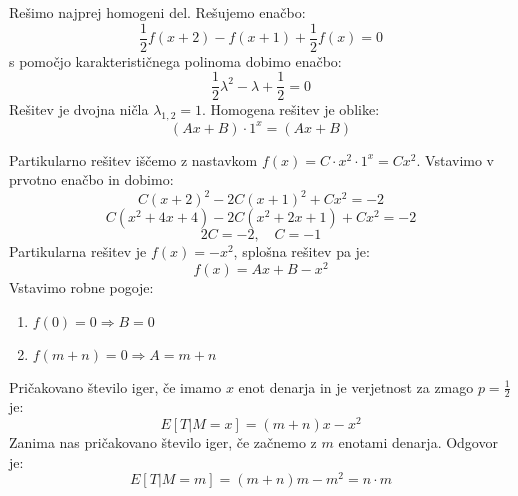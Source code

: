 \documentclass[12pt, a4paper]{article}
\begin{document}
Rešimo najprej homogeni del. Rešujemo enačbo: $$\frac{1}{2}f(x+2)-f(x+1)+\frac{1}{2}f(x)=0$$ s pomočjo karakterističnega polinoma dobimo enačbo: $$\frac{1}{2}\lambda^2-\lambda+\frac{1}{2}=0$$ Rešitev je dvojna ničla $\lambda_{1, 2}= 1$. Homogena rešitev je oblike: $$(Ax+B)\cdot 1^x=(Ax+B)$$

Partikularno rešitev iščemo z nastavkom $f(x)=C\cdot x^2\cdot 1^x= Cx^2$. Vstavimo v prvotno enačbo in dobimo:
$$C(x+2)^2-2C(x+1)^2+Cx^2=-2$$
$$C(x^2+4x+4)-2C(x^2+2x+1)+Cx^2=-2$$
$$2C=-2, \quad C = -1 $$ Partikularna rešitev je $f(x)=-x^2$, splošna rešitev pa je: $$f(x)=Ax+B-x^2$$
Vstavimo robne pogoje:
\begin{enumerate}
\item $f(0)=0\Rightarrow B = 0$
\item $f(m+n)=0 \Rightarrow A = m+n$
\end{enumerate}
Pričakovano število iger, če imamo $x$ enot denarja in je verjetnost za zmago $p=\frac{1}{2}$ je: $$E[T|M=x]= (m+n)x-x^2$$
Zanima nas pričakovano število iger, če začnemo z $m$ enotami denarja. Odgovor je:$$E[T|M=m]=(m+n)m-m^2= n\cdot m$$
\end{document}
